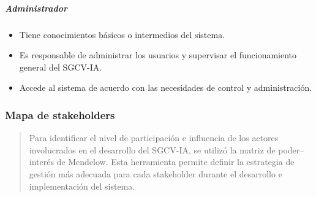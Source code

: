 \documentclass[
]{article}
\begin{document}
\subparagraph{Administrador}\label{administrador}

\begin{itemize}
\item
  Tiene conocimientos básicos o intermedios del sistema.
\item
  Es responsable de administrar los usuarios y supervisar el
  funcionamiento general del SGCV-IA.
\item
  Accede al sistema de acuerdo con las necesidades de control y
  administración.
\end{itemize}

\subsubsection{Mapa de stakeholders}\label{mapa-de-stakeholders}

\begin{quote}
Para identificar el nivel de participación e influencia de los actores
involucrados en el desarrollo del SGCV-IA, se utilizó la matriz de
poder--interés de Mendelow. Esta herramienta permite definir la
estrategia de gestión más adecuada para cada stakeholder durante el
desarrollo e implementación del sistema.
\end{quote}
\end{document}
